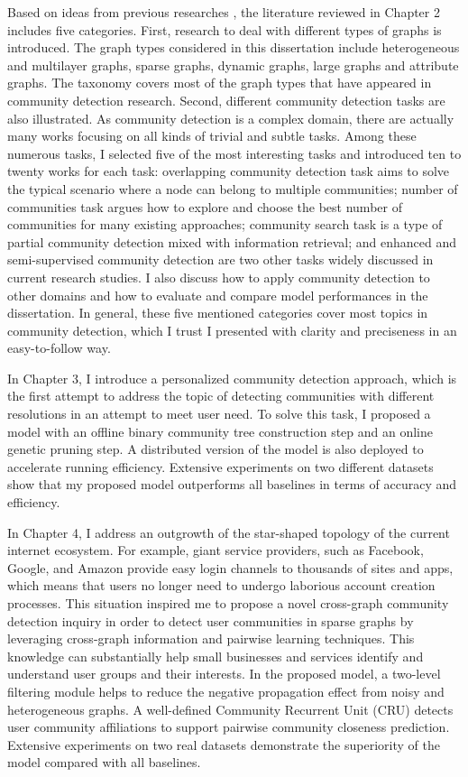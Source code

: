 Based on ideas from previous researches \cite{fortunato2010community, fortunato2016community}, the literature reviewed in Chapter 2 includes five categories. First,  research to deal with different types of graphs is introduced. The graph types considered in this dissertation include heterogeneous and multilayer graphs, sparse graphs, dynamic graphs, large graphs and attribute graphs. The taxonomy covers most of the graph types that have appeared in community detection research. Second, different community detection tasks are also illustrated. As community detection is a complex domain, there are actually many works focusing on all kinds of trivial and subtle tasks. Among these numerous tasks, I selected five of the most interesting tasks and introduced ten to twenty works for each task: overlapping community detection task aims to solve the typical scenario where a node can belong to multiple communities; number of communities task argues how to explore and choose the best number of communities for many existing approaches; community search task is a type of partial community detection mixed with information retrieval; and enhanced and semi-supervised community detection are  two other tasks widely discussed in current research studies. I also discuss how to apply community detection to other domains and how to evaluate and compare model performances in the dissertation. In general, these five mentioned categories cover most topics in community detection, which I trust I presented with clarity and preciseness in an easy-to-follow way.

In Chapter 3, I introduce a personalized community detection approach, which is the first attempt to address the topic of detecting communities with different resolutions in an attempt to meet user need. To solve this task, I proposed a model with an offline binary community tree construction step and an online genetic pruning step. A distributed version of the model is also deployed to accelerate running efficiency. Extensive experiments on two different datasets show that my proposed model outperforms all baselines in terms of accuracy and efficiency. 

In Chapter 4, I address an outgrowth of the star-shaped topology of the current internet ecosystem. For example, giant service providers, such as Facebook, Google, and Amazon provide easy login channels to thousands of sites and apps, which means that users no longer need to undergo laborious account creation processes. This situation inspired me to propose a novel cross-graph community detection inquiry in order to detect user communities in sparse graphs by leveraging cross-graph information and pairwise learning techniques. This knowledge can substantially help small businesses and services identify and understand user groups and their interests. In the proposed model, a two-level filtering module helps to reduce the negative propagation effect from noisy and heterogeneous graphs. A well-defined Community Recurrent Unit (CRU) detects user community affiliations to support pairwise community closeness prediction. Extensive experiments on two real datasets demonstrate the superiority of the model compared with all baselines.

